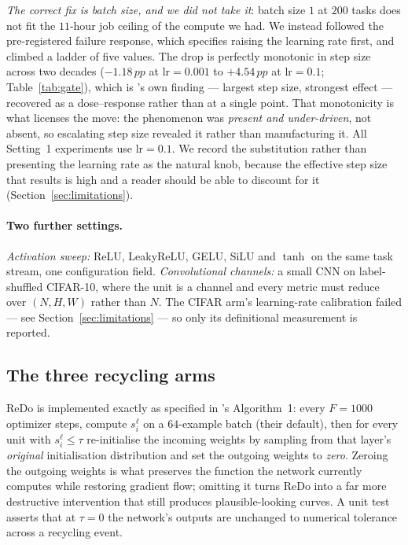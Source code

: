 \documentclass[10pt]{article}
\newcommand{\pp}{\,pp}
\begin{document}
\emph{The correct fix is batch size, and we did not take it}: batch size $1$ at
$200$ tasks does not fit the $11$-hour job ceiling of the compute we had. We
instead followed the pre-registered failure response, which specifies raising
the learning rate first, and climbed a ladder of five values. The drop is
perfectly monotonic in step size across two decades ($-1.18\pp$ at
$\text{lr}=0.001$ to $+4.54\pp$ at $\text{lr}=0.1$; Table~\ref{tab:gate}), which
is \citeauthor{dohare2024loss}'s own finding --- largest step size, strongest
effect --- recovered as a dose--response rather than at a single point. That
monotonicity is what licenses the move: the phenomenon was \emph{present and
under-driven}, not absent, so escalating step size revealed it rather than
manufacturing it. All Setting~1 experiments use $\text{lr}=0.1$. We record the
substitution rather than presenting the learning rate as the natural knob,
because the effective step size that results is high and a reader should be able
to discount for it (Section~\ref{sec:limitations}).

\paragraph{Two further settings.}
\emph{Activation sweep:} ReLU, LeakyReLU, GELU, SiLU and $\tanh$ on the same
task stream, one configuration field. \emph{Convolutional channels:} a small CNN
on label-shuffled CIFAR-10, where the unit is a channel and every metric must
reduce over $(N, H, W)$ rather than $N$. The CIFAR arm's learning-rate
calibration failed --- see Section~\ref{sec:limitations} --- so only its
definitional measurement is reported.

\subsection{The three recycling arms}



ReDo is implemented exactly as specified in \citet{sokar2023dormant}'s
Algorithm~1: every $F = 1000$ optimizer steps, compute $s^\ell_i$ on a
$64$-example batch (their default), then for every unit with $s^\ell_i \le \tau$
re-initialise the incoming weights by sampling from that layer's \emph{original}
initialisation distribution and set the outgoing weights to \emph{zero}. Zeroing
the outgoing weights is what preserves the function the network currently
computes while restoring gradient flow; omitting it turns ReDo into a far more
destructive intervention that still produces plausible-looking curves. A unit
test asserts that at $\tau=0$ the network's outputs are unchanged to numerical
tolerance across a recycling event.
\end{document}
